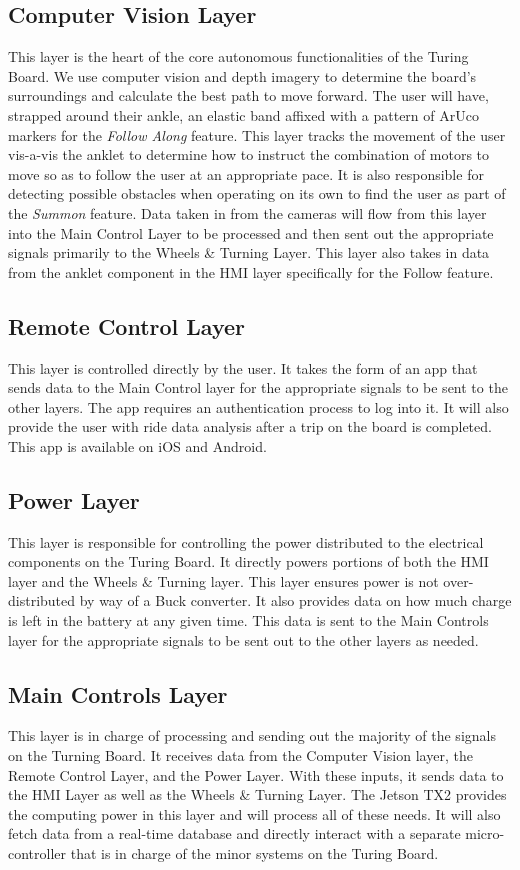 \subsection{Computer Vision Layer}
This layer is the heart of the core autonomous functionalities of the Turing Board. We use computer vision and depth imagery to determine the board's surroundings and calculate the best path to move forward. The user will have, strapped around their ankle, an elastic band affixed with a pattern of ArUco markers for the \textit{Follow Along} feature. This layer tracks the movement of the user vis-a-vis the anklet to determine how to instruct the combination of motors to move so as to follow the user at an appropriate pace. It is also responsible for detecting possible obstacles when operating on its own to find the user as part of the \textit{Summon} feature. 
Data taken in from the cameras will flow from this layer into the Main Control Layer to be processed and then sent out the appropriate signals primarily to the Wheels \& Turning Layer. This layer also takes in data from the anklet component in the HMI layer specifically for the Follow feature.

\subsection{Remote Control Layer}
This layer is controlled directly by the user. It takes the form of an app that sends data to the Main Control layer for the appropriate signals to be sent to the other layers. The app requires an authentication process to log into it. It will also provide the user with ride data analysis after a trip on the board is completed. This app is available on iOS and Android.

\subsection{Power Layer}
This layer is responsible for controlling the power distributed to the electrical components on the Turing Board. It directly powers portions of both the HMI layer and the Wheels \& Turning layer. This layer ensures power is not over-distributed by way of a Buck converter. It also provides data on how much charge is left in the battery at any given time. This data is sent to the Main Controls layer for the appropriate signals to be sent out to the other layers as needed.

\subsection{Main Controls Layer}
This layer is in charge of processing and sending out the majority of the signals on the Turning Board. It receives data from the Computer Vision layer, the Remote Control Layer, and the Power Layer. With these inputs, it sends data to the HMI Layer as well as the Wheels \& Turning Layer. The Jetson TX2 provides the computing power in this layer and will process all of these needs. It will also fetch data from a real-time database and directly interact with a separate micro-controller that is in charge of the minor systems on the Turing Board.


